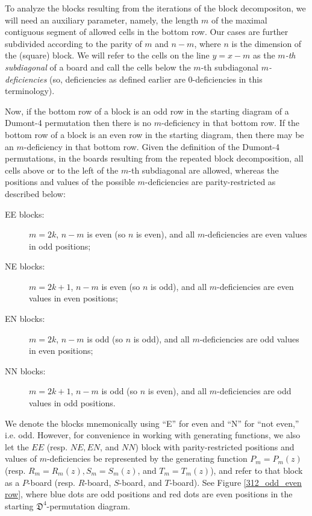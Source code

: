 \documentclass[
final
]{dmtcs-episciences}
\theoremstyle{definition}
\theoremstyle{remark}
\begin{document}
To analyze the blocks resulting from the iterations of the block decompositon, we will need an auxiliary parameter, namely, the length $m$ of the maximal contiguous segment of allowed cells in the bottom row. Our cases are further subdivided according to the parity of $m$ and $n-m$, where $n$ is the dimension of the (square) block. We will refer to the cells on the line $y=x-m$ as the \emph{$m$-th subdiagonal} of a board and call the cells below the $m$-th subdiagonal \emph{$m$-deficiencies} (so, deficiencies as defined earlier are 0-deficiencies in this terminology).

Now, if the bottom row of a block is an odd row in the starting diagram of a Dumont-4 permutation then there is no $m$-deficiency in that bottom row.  If the bottom row of a block is an even row in the starting diagram, then there may be an $m$-deficiency in that bottom row.  Given the definition of the Dumont-4 permutations, in the boards resulting from the repeated block decomposition, all cells  above or to the left of the $m$-th subdiagonal are allowed, whereas the positions and values of the possible $m$-deficiencies are parity-restricted as described below:
\begin{description}
\item[EE blocks:] $m=2k$, $n-m$ is even (so $n$ is even), and all $m$-deficiencies are even values in odd positions;
\item[NE blocks:] $m=2k+1$, $n-m$ is even (so $n$ is odd), and all $m$-deficiencies are even values in even positions;
\item[EN blocks:] $m=2k$, $n-m$ is odd (so $n$ is odd), and all $m$-deficiencies are odd values in even positions;
\item[NN blocks:] $m=2k+1$, $n-m$ is odd (so $n$ is even), and all $m$-deficiencies are odd values in odd positions.
\end{description}

We denote the blocks mnemonically using ``E'' for even and ``N'' for ``not even,'' i.e. odd. However, for convenience in working with generating functions, we also let the $EE$ (resp. $NE, EN$, and $NN$) block with parity-restricted positions and values of $m$-deficiencies be represented by the generating function $P_m=P_m(z)$ (resp. $R_m=R_m(z),S_m=S_m(z)$, and $T_m=T_m(z)$), and refer to that block as a $P$-board (resp. $R$-board, $S$-board, and $T$-board).  See Figure \ref{312_odd_even row}, where blue dots are odd positions and red dots are even positions in the starting $\mathfrak{D}^4$-permutation diagram.
\end{document}
